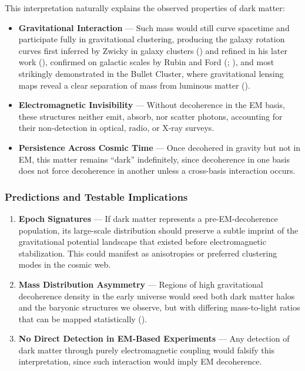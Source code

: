 \documentclass[
]{article}
\providecommand{\tightlist}{%
  \setlength{\itemsep}{0pt}\setlength{\parskip}{0pt}}
\begin{document}
This interpretation naturally explains the observed properties of dark
matter:

\begin{itemize}
\tightlist
\item
  \textbf{Gravitational Interaction} --- Such mass would still curve
  spacetime and participate fully in gravitational clustering, producing
  the galaxy rotation curves first inferred by Zwicky in galaxy clusters
  () and refined in his later
  work (), confirmed on galactic
  scales by Rubin and Ford (; ), and
  most strikingly demonstrated in the Bullet Cluster, where
  gravitational lensing maps reveal a clear separation of mass from
  luminous matter ().
\item
  \textbf{Electromagnetic Invisibility} --- Without decoherence in the
  EM basis, these structures neither emit, absorb, nor scatter photons,
  accounting for their non-detection in optical, radio, or X-ray
  surveys.
\item
  \textbf{Persistence Across Cosmic Time} --- Once decohered in gravity
  but not in EM, this matter remains ``dark'' indefinitely, since
  decoherence in one basis does not force decoherence in another unless
  a cross-basis interaction occurs.
\end{itemize}

\subsubsection{Predictions and Testable
Implications}\label{predictions-and-testable-implications}

\begin{enumerate}
\def\labelenumi{\arabic{enumi}.}
\tightlist
\item
  \textbf{Epoch Signatures} --- If dark matter represents a
  pre-EM-decoherence population, its large-scale distribution should
  preserve a subtle imprint of the gravitational potential landscape
  that existed before electromagnetic stabilization. This could manifest
  as anisotropies or preferred clustering modes in the cosmic web.
\item
  \textbf{Mass Distribution Asymmetry} --- Regions of high gravitational
  decoherence density in the early universe would seed both dark matter
  halos and the baryonic structures we observe, but with differing
  mass-to-light ratios that can be mapped statistically
  ().
\item
  \textbf{No Direct Detection in EM-Based Experiments} --- Any detection
  of dark matter through purely electromagnetic coupling would falsify
  this interpretation, since such interaction would imply EM
  decoherence.
\end{enumerate}
\end{document}
